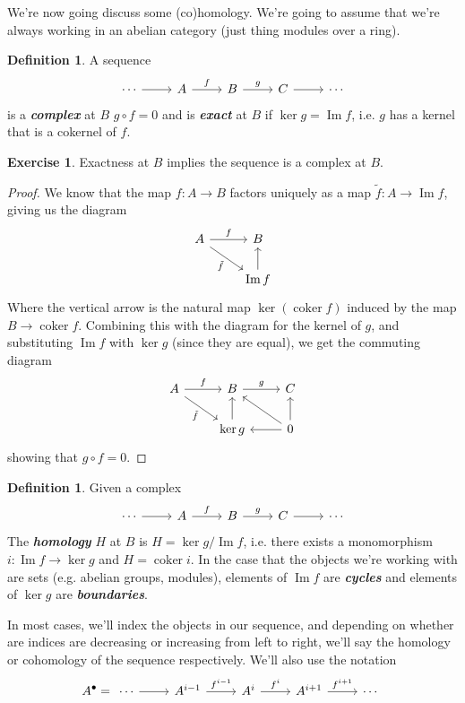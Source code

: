 \documentclass[psamsfonts]{amsart}
\theoremstyle{definition}
\newtheorem{defn}[thm]{Definition}
\newtheorem{exer}[thm]{Exercise}
\theoremstyle{remark}
\newcommand{\ib}[1]{\textbf{\textit{#1}}}
\DeclareMathOperator{\im}{Im}
\DeclareMathOperator{\coker}{coker}
\begin{document}
We're now going discuss some (co)homology. We're going to assume that we're always working in an abelian category (just thing modules over a ring).
\begin{defn}
A sequence
$$\begin{tikzcd}
\cdots \arrow[r,] & A \arrow[r,"f"] & B \arrow[r,"g"] & C \arrow[r] & \cdots
\end{tikzcd}$$
is a \ib{complex} at $B$ $g \circ f = 0$ and is \ib{exact} at $B$  if $\ker g = \im f$, i.e. $g$ has a kernel that is a cokernel of $f$.
\end{defn}
%
\begin{exer}
Exactness at $B$ implies the sequence is a complex at $B$.
\end{exer}
%
\begin{proof}
We know that the map $f: A \to B$ factors uniquely as a map $\tilde{f}: A \to \im f$, giving us the diagram
$$\begin{tikzcd}
A \arrow[dr, "\tilde{f}"']\arrow[r, "f"] & B \\
& \im f \ar[u]
\end{tikzcd}$$
Where the vertical arrow is the natural map $\ker (\coker f)$ induced by the map $B \to \coker f$. Combining this with the diagram for the kernel of $g$, and substituting $\im f$ with $\ker g$ (since they are equal), we get the commuting diagram
$$\begin{tikzcd}
A \arrow[dr, "\tilde{f}"']\arrow[r, "f"] & B \arrow[r, "g"] & C \\
& \ker g \ar[u] & 0 \arrow[l] \arrow[ul] \arrow[u]
\end{tikzcd}$$
showing that $g \circ f = 0$.
\end{proof}
%
\begin{defn}
Given a complex
$$\begin{tikzcd}
\cdots \arrow[r] & A \arrow[r, "f"] & B \arrow[r, "g"] & C \arrow[r] & \cdots
\end{tikzcd}$$
The \ib{homology} $H$ at $B$ is $H = \ker g / \im f$, i.e. there exists a monomorphism $i : \im f \to \ker g$ and $H = \coker i$. In the case that the objects we're working with are sets (e.g. abelian groups, modules), elements of $\im f$ are \ib{cycles} and elements of $\ker g$ are \ib{boundaries}.
\end{defn}
%
In most cases, we'll index the objects in our sequence, and depending on whether are indices are decreasing or increasing from left to right, we'll say the homology or cohomology of the sequence respectively. We'll also use the notation
$$A^\bullet = \begin{tikzcd}
\cdots \arrow[r] & A^{i-1} \arrow[r, "f^{i-1}"] & A^i \arrow[r, "f^i"] & A^{i+1} \arrow[r, "f^{i+1}"] & \cdots
\end{tikzcd}$$
\end{document}
